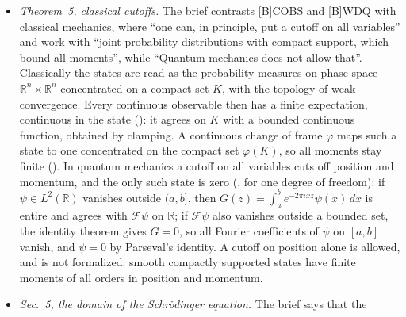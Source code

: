 \documentclass[11pt]{article}
\begin{document}
\begin{itemize}
  tell the systems apart either. As for [B]STDIST, $U$ does not carry the positions and
  momenta. The proof is the Hermite characterization of $\mathcal{S}$ (the
  $N$-representation of Reed--Simon~I, Sec.~V.3 and its appendix): $f \in L^2(\mathbb{R}^n)$ is a Schwartz function exactly when
  $\sup_\alpha (1 + |\alpha|)^K |c_\alpha(f)| < \infty$ for all $K$, and these suprema
  define the topology of $\mathcal{S}$. One direction uses the operator
  $\sum_i (x_i + \partial_i)(x_i - \partial_i) + 2$, which multiplies $c_\alpha$ by
  $2(|\alpha| + 1 + n)$, the other the Sobolev bound for the values, Parseval's identity and
  the ladder relations. The unitary $U$ relabels the Hermite functions,
  $h_\alpha \mapsto h_{\sigma(\alpha)}$, by a bijection $\sigma\colon \mathbb{N}^n \to
  \mathbb{N}^m$ built from iterated Cantor pairings, for which $1 + |\sigma(\alpha)|$ and
  $1 + |\alpha|$ are polynomially bounded by each other.
\item \emph{Theorem~5, classical cutoffs.} The brief contrasts [B]COBS and [B]WDQ with
  classical mechanics, where ``one can, in principle, put a cutoff on all variables'' and work
  with ``joint probability distributions with compact support, which bound all moments'', while
  ``Quantum mechanics does not allow that''. Classically the states are read as the probability
  measures on phase space $\mathbb{R}^n \times \mathbb{R}^n$ concentrated on a compact set
  $K$, with the topology of weak convergence. Every continuous observable then has a finite
  expectation, continuous in the state (): it agrees on $K$ with a
  bounded continuous function, obtained by clamping. A continuous change of frame $\varphi$
  maps such a state to one concentrated on the compact set $\varphi(K)$, so all moments stay
  finite (). In quantum mechanics a cutoff on all variables cuts off
  position and momentum, and the only such state is zero (, for one
  degree of freedom): if $\psi \in L^2(\mathbb{R})$ vanishes outside $(a, b]$, then
  $G(z) = \int_a^b e^{-2\pi i x z} \psi(x)\,dx$ is entire and agrees with $\mathcal{F}\psi$ on
  $\mathbb{R}$; if $\mathcal{F}\psi$ also vanishes outside a bounded set, the identity theorem
  gives $G = 0$, so all Fourier coefficients of $\psi$ on $[a, b]$ vanish, and $\psi = 0$ by
  Parseval's identity. A cutoff on position alone is allowed, and is not formalized: smooth
  compactly supported states have finite moments of all orders in position and momentum.
\item \emph{Sec.~5, the domain of the Schr\"odinger equation.} The brief says that the

\end{itemize}
\end{document}
